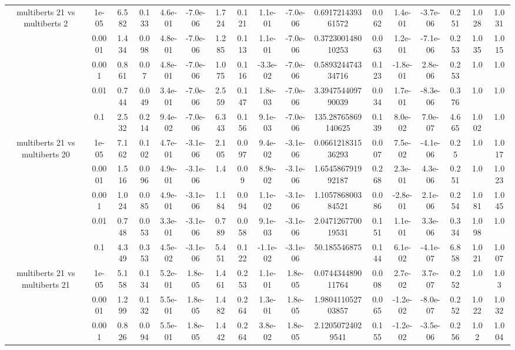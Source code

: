 \begin{tabular}{|c|c|c|c|c|c|c|c|c|c|c|c|c|c|c|c|c|}
\hline
\multirow{5}{*}{multiberts 21 vs multiberts 2} & 1e-05 & 6.582 & 0.133 & 4.6e-01 & -7.0e-06 & 1.724 & 0.121 & 1.1e-01 & -7.0e-06 & 0.691721439361572 & 0.062 & 1.4e-01 & -3.7e-06 & 0.251 & 1.028 & 1.031 \\
 & 0.0001 & 1.434 & 0.098 & 4.8e-01 & -7.0e-06 & 1.285 & 0.113 & 1.1e-01 & -7.0e-06 & 0.372300148010253 & 0.063 & 1.2e-01 & -7.1e-06 & 0.253 & 1.035 & 1.015 \\
 & 0.001 & 0.861 & 0.07 & 4.8e-01 & -7.0e-06 & 1.075 & 0.116 & -3.3e-02 & -7.0e-06 & 0.589324474334716 & 0.123 & -1.8e-01 & 2.8e-06 & 0.253 & 1.0 & 1.0 \\
 & 0.01 & 0.744 & 0.049 & 3.4e-01 & -7.0e-06 & 2.559 & 0.147 & 1.8e-03 & -7.0e-06 & 3.394754409790039 & 0.034 & 1.7e-01 & -8.3e-06 & 0.376 & 1.0 & 1.0 \\
 & 0.1 & 2.532 & 0.214 & 9.4e-02 & -7.0e-06 & 6.343 & 0.156 & 9.1e-03 & -7.0e-06 & 135.28765869140625 & 0.139 & 8.0e-02 & 7.0e-07 & 4.665 & 1.002 & 1.0 \\
\hline
\multirow{5}{*}{multiberts 21 vs multiberts 20} & 1e-05 & 7.162 & 0.102 & 4.7e-01 & -3.1e-06 & 2.105 & 0.097 & 9.4e-02 & -3.1e-06 & 0.066121831536293 & 0.007 & 7.5e-02 & -4.1e-06 & 0.25 & 1.0 & 1.017 \\
 & 0.0001 & 1.516 & 0.096 & 4.9e-01 & -3.1e-06 & 1.4 & 0.09 & 8.9e-02 & -3.1e-06 & 1.654586791992187 & 0.268 & 2.3e-01 & 4.3e-06 & 0.251 & 1.0 & 1.023 \\
 & 0.001 & 1.024 & 0.085 & 4.9e-01 & -3.1e-06 & 1.184 & 0.094 & 1.1e-02 & -3.1e-06 & 1.105786800384521 & 0.086 & -2.8e-01 & 2.1e-06 & 0.254 & 1.081 & 1.045 \\
 & 0.01 & 0.748 & 0.053 & 3.3e-01 & -3.1e-06 & 0.789 & 0.058 & 9.1e-03 & -3.1e-06 & 2.047126770019531 & 0.151 & 1.1e-01 & 3.3e-06 & 0.334 & 1.098 & 1.0 \\
 & 0.1 & 4.349 & 0.353 & 4.5e-02 & -3.1e-06 & 5.451 & 0.122 & -1.1e-02 & -3.1e-06 & 50.185546875 & 0.144 & 6.1e-02 & -4.1e-07 & 6.858 & 1.021 & 1.007 \\
\hline
\multirow{5}{*}{multiberts 21 vs multiberts 21} & 1e-05 & 5.158 & 0.134 & 5.2e-01 & 1.8e-05 & 1.461 & 0.253 & 1.1e-01 & 1.8e-05 & 0.074434489011764 & 0.008 & 2.7e-02 & 3.7e-07 & 0.252 & 1.0 & 1.03 \\
 & 0.0001 & 1.299 & 0.132 & 5.5e-01 & 1.8e-05 & 1.482 & 0.264 & 1.3e-01 & 1.8e-05 & 1.980411052703857 & 0.065 & -1.2e-02 & -8.0e-07 & 0.252 & 1.022 & 1.032 \\
 & 0.001 & 0.826 & 0.094 & 5.5e-01 & 1.8e-05 & 1.442 & 0.264 & 3.8e-02 & 1.8e-05 & 2.12050724029541 & 0.155 & -1.2e-02 & -3.5e-06 & 0.256 & 1.02 & 1.004 \\

\end{tabular}
